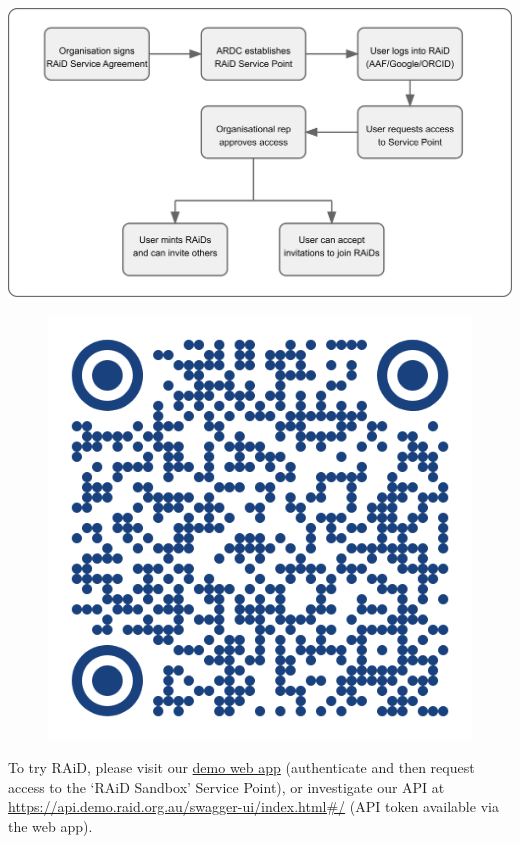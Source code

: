 \documentclass[a0,portrait]{a0poster}
\newenvironment{Figure}
  {\par\medskip\noindent\minipage{\linewidth}}
  {\endminipage\par\medskip}
\begin{document}
\begin{multicols}{3}
\begin{Figure}
  \centering
  \includegraphics[width=0.9\linewidth]{figures/raid-workflow.png}
  \label{raid-workflow}
\end{Figure}

\vspace{1cm}

\setlength{\intextsep}{0pt}  %
\setlength{\columnsep}{10pt}  %

\begin{figure}
\includegraphics[width=0.08\columnwidth]{figures/QR-code.png}
\end{figure}

\large{To try RAiD, please visit our {\href{https://app.demo.raid.org.au/}{demo web app}} (authenticate and then request access to the ‘RAiD Sandbox’ Service Point), or investigate our API at \href{https://api.demo.raid.org.au/swagger-ui/index.html\#/}{https://api.demo.raid.org.au/swagger-ui/index.html\#/} (API token available via the web app).


\vspace{-1cm}

}
\end{multicols}
\end{document}
